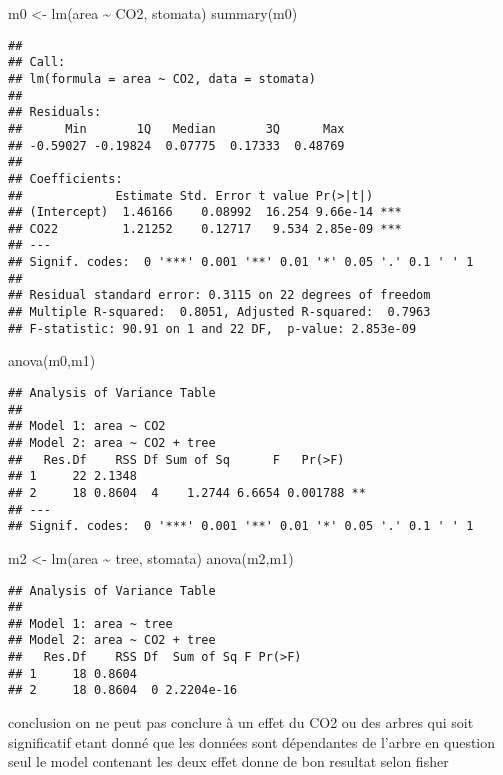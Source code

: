 \documentclass[
]{article}
\newenvironment{Shaded}{\begin{snugshade}}{\end{snugshade}}
\newcommand{\FunctionTok}[1]{\textcolor[rgb]{0.00,0.00,0.00}{#1}}
\newcommand{\NormalTok}[1]{#1}
\newcommand{\OtherTok}[1]{\textcolor[rgb]{0.56,0.35,0.01}{#1}}
\newcommand{\SpecialCharTok}[1]{\textcolor[rgb]{0.00,0.00,0.00}{#1}}
\begin{document}
\begin{Shaded}
\begin{Highlighting}[]
\NormalTok{m0 }\OtherTok{\textless{}{-}} \FunctionTok{lm}\NormalTok{(area }\SpecialCharTok{\textasciitilde{}}\NormalTok{ CO2, stomata)}
\FunctionTok{summary}\NormalTok{(m0)}
\end{Highlighting}
\end{Shaded}

\begin{verbatim}
## 
## Call:
## lm(formula = area ~ CO2, data = stomata)
## 
## Residuals:
##      Min       1Q   Median       3Q      Max 
## -0.59027 -0.19824  0.07775  0.17333  0.48769 
## 
## Coefficients:
##             Estimate Std. Error t value Pr(>|t|)    
## (Intercept)  1.46166    0.08992  16.254 9.66e-14 ***
## CO22         1.21252    0.12717   9.534 2.85e-09 ***
## ---
## Signif. codes:  0 '***' 0.001 '**' 0.01 '*' 0.05 '.' 0.1 ' ' 1
## 
## Residual standard error: 0.3115 on 22 degrees of freedom
## Multiple R-squared:  0.8051, Adjusted R-squared:  0.7963 
## F-statistic: 90.91 on 1 and 22 DF,  p-value: 2.853e-09
\end{verbatim}

\begin{Shaded}
\begin{Highlighting}[]
\FunctionTok{anova}\NormalTok{(m0,m1)}
\end{Highlighting}
\end{Shaded}

\begin{verbatim}
## Analysis of Variance Table
## 
## Model 1: area ~ CO2
## Model 2: area ~ CO2 + tree
##   Res.Df    RSS Df Sum of Sq      F   Pr(>F)   
## 1     22 2.1348                                
## 2     18 0.8604  4    1.2744 6.6654 0.001788 **
## ---
## Signif. codes:  0 '***' 0.001 '**' 0.01 '*' 0.05 '.' 0.1 ' ' 1
\end{verbatim}

\begin{Shaded}
\begin{Highlighting}[]
\NormalTok{m2 }\OtherTok{\textless{}{-}} \FunctionTok{lm}\NormalTok{(area }\SpecialCharTok{\textasciitilde{}}\NormalTok{ tree, stomata)}
\FunctionTok{anova}\NormalTok{(m2,m1)}
\end{Highlighting}
\end{Shaded}

\begin{verbatim}
## Analysis of Variance Table
## 
## Model 1: area ~ tree
## Model 2: area ~ CO2 + tree
##   Res.Df    RSS Df  Sum of Sq F Pr(>F)
## 1     18 0.8604                       
## 2     18 0.8604  0 2.2204e-16
\end{verbatim}

conclusion on ne peut pas conclure à un effet du CO2 ou des arbres qui
soit significatif etant donné que les données sont dépendantes de
l'arbre en question seul le model contenant les deux effet donne de bon
resultat selon fisher
\end{document}
